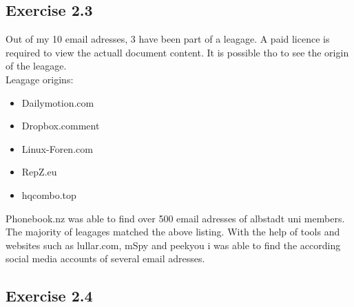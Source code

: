 \documentclass[a4paper,10pt]{article}
\begin{document}
\newpage
\subsection{Exercise 2.3}
Out of my 10 email adresses, 3 have been part of a leagage.
A paid licence is required to view the actuall document content.
It is possible tho to see the origin of the leagage.\\
Leagage origins:
\begin{itemize}
 \item Dailymotion.com
 \item Dropbox.comment
 \item Linux-Foren.com
 \item RepZ.eu
 \item hqcombo.top
\end{itemize}
\vspace{8mm}
Phonebook.nz was able to find over 500 email adresses of albstadt uni members. The majority of leagages matched the above listing.
With the help of tools and websites such as lullar.com, mSpy and peekyou i was able to find the according social media accounts of several email adresses. 
\subsection{Exercise 2.4}
\end{document}
